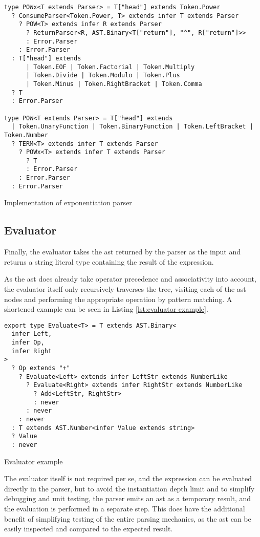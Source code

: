 \begin{listing}[ht]
  \begin{verbatim}
type POWx<T extends Parser> = T["head"] extends Token.Power
  ? ConsumeParser<Token.Power, T> extends infer T extends Parser
    ? POW<T> extends infer R extends Parser
      ? ReturnParser<R, AST.Binary<T["return"], "^", R["return"]>>
      : Error.Parser
    : Error.Parser
  : T["head"] extends
      | Token.EOF | Token.Factorial | Token.Multiply
      | Token.Divide | Token.Modulo | Token.Plus
      | Token.Minus | Token.RightBracket | Token.Comma
  ? T
  : Error.Parser

type POW<T extends Parser> = T["head"] extends
  | Token.UnaryFunction | Token.BinaryFunction | Token.LeftBracket | Token.Number
  ? TERM<T> extends infer T extends Parser
    ? POWx<T> extends infer T extends Parser
      ? T
      : Error.Parser
    : Error.Parser
  : Error.Parser
\end{verbatim}
  \caption{Implementation of exponentiation parser}\label{lst:pow-parser}
\end{listing}

\subsection{Evaluator}

Finally, the evaluator takes the \acrshort{ast} returned by the parser as the input and returns a string literal type containing the result of the expression.

As the \acrshort{ast} does already take operator precedence and associativity into account, the evaluator itself only recursively traverses the tree, visiting each of the \acrshort{ast} nodes and performing the appropriate operation by pattern matching. A shortened example can be seen in Listing \ref{lst:evaluator-example}.

\begin{listing}[ht]
  \begin{verbatim}
export type Evaluate<T> = T extends AST.Binary<
  infer Left,
  infer Op,
  infer Right
>
  ? Op extends "+"
    ? Evaluate<Left> extends infer LeftStr extends NumberLike
      ? Evaluate<Right> extends infer RightStr extends NumberLike
        ? Add<LeftStr, RightStr>
        : never
      : never
    : never
  : T extends AST.Number<infer Value extends string>
  ? Value
  : never
\end{verbatim}
  \caption{Evaluator example}\label{lst:evaluator-example}
\end{listing}

The evaluator itself is not required per se, and the expression can be evaluated directly in the parser, but to avoid the instantiation depth limit and to simplify debugging and unit testing, the parser emits an \acrshort{ast} as a temporary result, and the evaluation is performed in a separate step. This does have the additional benefit of simplifying testing of the entire parsing mechanics, as the \acrshort{ast} can be easily inspected and compared to the expected result.
